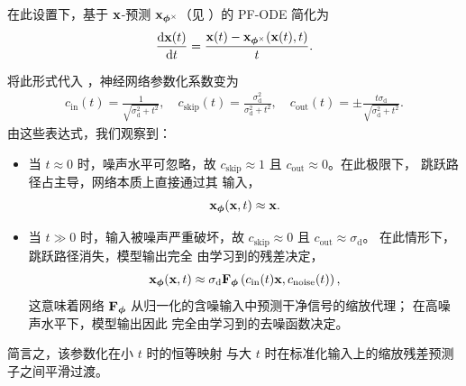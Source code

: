 在此设置下，基于 ${\mathbf{x}}$-预测 ${\mathbf{x}}_{\bm{\phi}^\times}$（见 ）的 PF-ODE 简化为
\begin{align*}
    \frac{\mathop{}\!\mathrm{d} {\mathbf{x}}(t)}{\mathop{}\!\mathrm{d} t} = \frac{{\mathbf{x}}(t) - {\mathbf{x}}_{\bm{\phi}^\times}({\mathbf{x}}(t), t)}{t}.
\end{align*}

将此形式代入 ，神经网络参数化系数变为
\begin{align}\label{eq:edm-simple-coefficients}
    c_{\mathrm{in}}(t) = \frac{1}{\sqrt{\sigma_{\mathrm{d}}^2 + t^2}}, \quad
    c_{\mathrm{skip}}(t) = \frac{\sigma_{\mathrm{d}}^2}{\sigma_{\mathrm{d}}^2 + t^2}, \quad
    c_{\mathrm{out}}(t) = \pm \frac{t \sigma_{\mathrm{d}}}{\sqrt{\sigma_{\mathrm{d}}^2 + t^2}}.
\end{align}
由这些表达式，我们观察到：
\begin{itemize}
    \item 当 $t \approx 0$ 时，噪声水平可忽略，故
    $c_{\mathrm{skip}} \approx 1$ 且 $c_{\mathrm{out}} \approx 0$。在此极限下，
    跳跃路径占主导，网络本质上直接通过其
    输入，
    \[
    {\mathbf{x}}_{\bm{\phi}}({\mathbf{x}}, t) \approx {\mathbf{x}}.
    \]
    \item 当 $t \gg 0$ 时，输入被噪声严重破坏，故
    $c_{\mathrm{skip}} \approx 0$ 且 $c_{\mathrm{out}} \approx \sigma_{\mathrm{d}}$。
    在此情形下，跳跃路径消失，模型输出完全
    由学习到的残差决定，
    \[
    {\mathbf{x}}_{\bm{\phi}}({\mathbf{x}}, t) \approx \sigma_{\mathrm{d}} {\mathbf{F}}_{\bm{\phi}}\left(c_{\mathrm{in}}(t){\mathbf{x}}, c_{\mathrm{noise}}(t)\right),
    \]
    这意味着网络 ${\mathbf{F}}_{\bm{\phi}}$ 从归一化的含噪输入中预测干净信号的缩放代理；
    在高噪声水平下，模型输出因此
    完全由学习到的去噪函数决定。
\end{itemize}
简言之，该参数化在小 $t$ 时的恒等映射
与大 $t$ 时在标准化输入上的缩放残差预测子之间平滑过渡。
